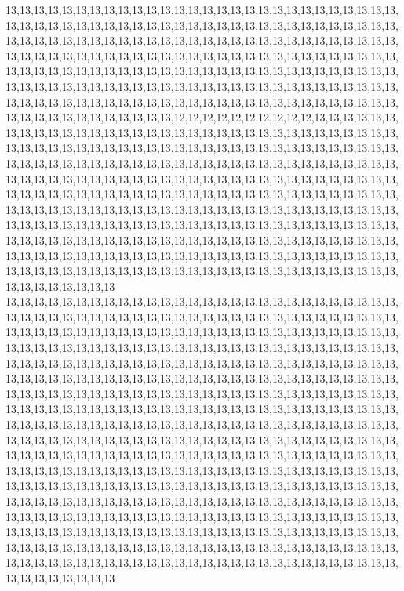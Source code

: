 13,13,13,13,13,13,13,13,13,13,13,13,13,13,13,13,13,13,13,13,13,13,13,13,13,13,13,13,13,13,13,13,13,13,13,13,13,13,13,13,13,13,13,13,13,13,13,13,13,13,13,13,13,13,13,13,13,13,13,13,13,13,13,13,13,13,13,13,13,13,13,13,13,13,13,13,13,13,13,13,13,13,13,13,13,13,13,13,13,13,13,13,13,13,13,13,13,13,13,13,13,13,13,13,13,13,13,13,13,13,13,13,13,13,13,13,13,13,13,13,13,13,13,13,13,13,13,13,13,13,13,13,13,13,13,13,13,13,13,13,13,13,13,13,13,13,13,13,13,13,13,13,13,13,13,13,13,13,13,13,13,13,13,13,13,13,13,13,13,13,13,13,13,13,13,13,13,13,13,13,13,13,13,13,13,13,13,13,13,13,13,13,13,13,13,13,13,13,13,13,13,13,13,13,13,13,13,13,12,12,12,12,12,12,12,12,12,12,13,13,13,13,13,13,13,13,13,13,13,13,13,13,13,13,13,13,13,13,13,13,13,13,13,13,13,13,13,13,13,13,13,13,13,13,13,13,13,13,13,13,13,13,13,13,13,13,13,13,13,13,13,13,13,13,13,13,13,13,13,13,13,13,13,13,13,13,13,13,13,13,13,13,13,13,13,13,13,13,13,13,13,13,13,13,13,13,13,13,13,13,13,13,13,13,13,13,13,13,13,13,13,13,13,13,13,13,13,13,13,13,13,13,13,13,13,13,13,13,13,13,13,13,13,13,13,13,13,13,13,13,13,13,13,13,13,13,13,13,13,13,13,13,13,13,13,13,13,13,13,13,13,13,13,13,13,13,13,13,13,13,13,13,13,13,13,13,13,13,13,13,13,13,13,13,13,13,13,13,13,13,13,13,13,13,13,13,13,13,13,13,13,13,13,13,13,13,13,13,13,13,13,13,13,13,13,13,13,13,13,13,13,13,13,13,13,13,13,13,13,13,13,13,13,13,13,13,13,13,13,13,13,13,13,13,13,13,13,13,13,13,13,13,13,13,13,13,13,13,13,13,13,13,13,13,13,13,13,13,13,13,13,13,13,13,13,13,13,13,13,13,13,13,13,13,13,13,13,13,13,13,13,13,13,13,13,13,13,13,13,13,13,13
13,13,13,13,13,13,13,13,13,13,13,13,13,13,13,13,13,13,13,13,13,13,13,13,13,13,13,13,13,13,13,13,13,13,13,13,13,13,13,13,13,13,13,13,13,13,13,13,13,13,13,13,13,13,13,13,13,13,13,13,13,13,13,13,13,13,13,13,13,13,13,13,13,13,13,13,13,13,13,13,13,13,13,13,13,13,13,13,13,13,13,13,13,13,13,13,13,13,13,13,13,13,13,13,13,13,13,13,13,13,13,13,13,13,13,13,13,13,13,13,13,13,13,13,13,13,13,13,13,13,13,13,13,13,13,13,13,13,13,13,13,13,13,13,13,13,13,13,13,13,13,13,13,13,13,13,13,13,13,13,13,13,13,13,13,13,13,13,13,13,13,13,13,13,13,13,13,13,13,13,13,13,13,13,13,13,13,13,13,13,13,13,13,13,13,13,13,13,13,13,13,13,13,13,13,13,13,13,13,13,13,13,13,13,13,13,13,13,13,13,13,13,13,13,13,13,13,13,13,13,13,13,13,13,13,13,13,13,13,13,13,13,13,13,13,13,13,13,13,13,13,13,13,13,13,13,13,13,13,13,13,13,13,13,13,13,13,13,13,13,13,13,13,13,13,13,13,13,13,13,13,13,13,13,13,13,13,13,13,13,13,13,13,13,13,13,13,13,13,13,13,13,13,13,13,13,13,13,13,13,13,13,13,13,13,13,13,13,13,13,13,13,13,13,13,13,13,13,13,13,13,13,13,13,13,13,13,13,13,13,13,13,13,13,13,13,13,13,13,13,13,13,13,13,13,13,13,13,13,13,13,13,13,13,13,13,13,13,13,13,13,13,13,13,13,13,13,13,13,13,13,13,13,13,13,13,13,13,13,13,13,13,13,13,13,13,13,13,13,13,13,13,13,13,13,13,13,13,13,13,13,13,13,13,13,13,13,13,13,13,13,13,13,13,13,13,13,13,13,13,13,13,13,13,13,13,13,13,13,13,13,13,13,13,13,13,13,13,13,13,13,13,13,13,13,13,13,13,13,13,13,13,13,13,13,13,13,13,13,13,13,13,13,13,13,13,13,13,13,13,13,13,13,13,13,13,13,13,13,13,13,13,13,13,13,13,13,13,13,13,13,13,13,13,13,13,13,13,13,13,13,13
